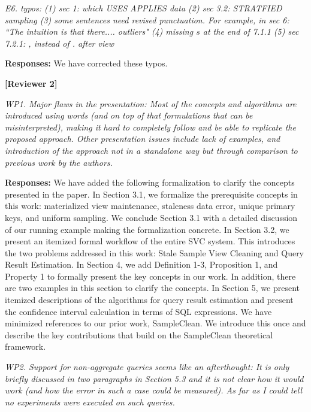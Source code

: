 \vspace{1em}
\emph{E6. typos:
(1) sec 1: which USES APPLIES data
(2) sec 3.2: STRATFIED sampling
(3) some sentences need revised punctuation. For example, in sec 6: ``The intuition is that there.... outliers"
(4) missing $s$ at the end of 7.1.1
(5) sec 7.2.1: , instead of . after view}

\vspace{.25em}

{\bf Responses:} We have corrected these typos.



\vspace{2em}
\noindent\textbf{[Reviewer 2]}

\vspace{1em}
\emph{WP1. Major flaws in the presentation: Most of the concepts and algorithms are introduced using words (and on top of that formulations that can be misinterpreted), making it hard to completely follow and be able to replicate the proposed approach. Other presentation issues include lack of examples, and introduction of the approach not in a standalone way but through comparison to previous work by the authors.}

\vspace{.25em}

{\bf Responses:} We have added the following formalization to clarify the concepts presented in the paper. In Section 3.1, we formalize the prerequisite concepts in this work: materialized view maintenance, staleness data error, unique primary keys, and uniform sampling. We conclude Section 3.1 with a detailed discussion of our running example making the formalization concrete. In Section 3.2, we present an itemized formal workflow of the entire SVC system. This introduces the two problems addressed in this work: Stale Sample View Cleaning and Query Result Estimation. In Section 4, we add Definition 1-3, Proposition 1, and Property 1 to formally present the key concepts in our work. In addition, there are two examples in this section to clarify the concepts. In Section 5, we present itemized descriptions of the algorithms for query result estimation and present the confidence interval calculation in terms of SQL expressions. We have minimized references to our prior work, SampleClean. We introduce this once and describe the key contributions that build on the SampleClean theoretical framework.

\vspace{1em}
\emph{WP2. Support for non-aggregate queries seems like an afterthought: It is only briefly discussed in two paragraphs in Section 5.3 and it is not clear how it would work (and how the error in such a case could be measured). As far as I could tell no experiments were executed on such queries.}

